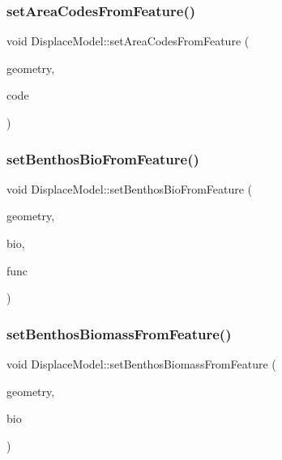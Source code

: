 \subsubsection{\texorpdfstring{setAreaCodesFromFeature()}{setAreaCodesFromFeature()}}
{\footnotesize\ttfamily void Displace\+Model\+::set\+Area\+Codes\+From\+Feature (\begin{DoxyParamCaption}\item[{O\+G\+R\+Geometry $\ast$}]{geometry,  }\item[{int}]{code }\end{DoxyParamCaption})}

\mbox{\label{class_displace_model_a2b59b9127344987d46aa9c89c9633ea4}} 
\subsubsection{\texorpdfstring{setBenthosBioFromFeature()}{setBenthosBioFromFeature()}}
{\footnotesize\ttfamily void Displace\+Model\+::set\+Benthos\+Bio\+From\+Feature (\begin{DoxyParamCaption}\item[{O\+G\+R\+Geometry $\ast$}]{geometry,  }\item[{double}]{bio,  }\item[{std\+::function$<$ void(std\+::shared\+\_\+ptr$<$ \mbox{\hyperlink{class_node_data}{Node\+Data}} $>$, double)$>$}]{func }\end{DoxyParamCaption})\hspace{0.3cm}{\ttfamily [protected]}}

\mbox{\label{class_displace_model_a7688b7211352106bbb324ff1dfe68965}} 
\subsubsection{\texorpdfstring{setBenthosBiomassFromFeature()}{setBenthosBiomassFromFeature()}}
{\footnotesize\ttfamily void Displace\+Model\+::set\+Benthos\+Biomass\+From\+Feature (\begin{DoxyParamCaption}\item[{O\+G\+R\+Geometry $\ast$}]{geometry,  }\item[{double}]{bio }\end{DoxyParamCaption})}

